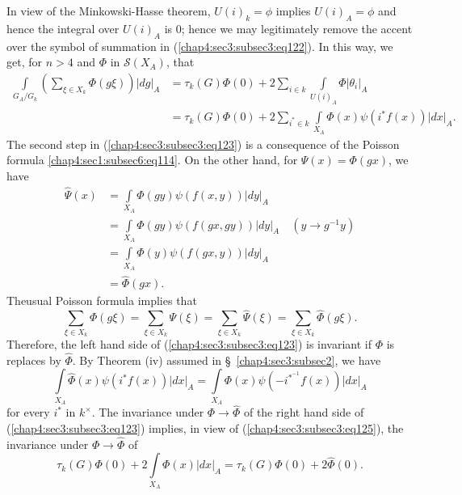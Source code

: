 In view of the Minkowski-Hasse theorem, $U(i)_{k}=\phi$ implies
$U(i)_{A}=\phi$ and hence the integral over $U(i)_{A}$ is $0$; hence
we may legitimately remove the accent over the symbol of summation in
(\ref{chap4:sec3:subsec3:eq122}). In this way, we get, for $n>4$ and $\Phi$ in
$\mathscr{S}(X_{A})$, that
\begin{equation*}
  \begin{split}
    \int\limits_{G_{A}/G_{k}}\left(\sum_{\xi\in
      X_{k}}\Phi(g\xi)\right)|dg|_{A} &= \tau_{k}(G)\Phi(0)+2\sum_{i\in
      k}\int\limits_{U(i)_{A}}\Phi|\theta_{i}|_{A}\\
    &= \tau_{k}(G)\Phi(0)+2\sum_{i^{\ast}\in
      k}\int\limits_{X_{A}}\Phi(x)\psi(i^{\ast}f(x))|dx|_{A}. 
  \end{split}\tag{123}\label{chap4:sec3:subsec3:eq123}
\end{equation*}
The second step in (\ref{chap4:sec3:subsec3:eq123}) is a consequence of the Poisson formula
\ref{chap4:sec1:subsec6:eq114}. On the other hand, for $\Psi(x)=\Phi(gx)$, we have
\begin{align*}
  \hat{\Psi}(x) &= \int\limits_{X_{A}}\Phi(gy)\psi(f(x,y))|dy|_{A}\\
  &= \int\limits_{X_{A}}\Phi(gy)\psi(f(gx,gy))|dy|_{A}\quad (y\to
  g^{-1}y)\\
  &= \int\limits_{X_{A}}\Phi(y)\psi(f(gx,y))|dy|_{A}\\
  &= \hat{\Phi}(gx).
\end{align*}
The\pageoriginale usual Poisson formula implies that
\begin{equation*}
  \sum_{\xi \in X_{k}}\Phi(g\xi)=\sum_{\xi\in
    X_{k}}\Psi(\xi)=\sum_{\xi\in X_{k}}\hat{\Psi}(\xi)
  =\sum_{\xi\in
    X_{k}}\hat{\Phi}(g\xi).\tag{124} \label{chap4:sec3:subsec3:eq124}
\end{equation*}
Therefore, the left hand side of (\ref{chap4:sec3:subsec3:eq123}) is invariant if $\Phi$ is
replaces by $\hat{\Phi}$. By Theorem (iv) assumed in
\S\ \ref{chap4:sec3:subsec2}, we have
\begin{equation*}
  \int\limits_{X_{A}}\hat{\Phi}(x)\psi(i^{\ast}f(x))|dx|_{A}
  =\int\limits_{X_{A}}\Phi(x)\psi(-i^{\ast^{-1}}f(x))|dx|_{A}
  \tag{125} \label{chap4:sec3:subsec3:eq125}  
\end{equation*}
for every $i^{\ast}$ in $k^{\times}$. The invariance under $\Phi\to
\hat{\Phi}$ of the right hand side of (\ref{chap4:sec3:subsec3:eq123})
implies, in view of (\ref{chap4:sec3:subsec3:eq125}), the invariance under $\Phi\to
\hat{\Phi}$ of
$$
\tau_{k}(G)\Phi(0)+2\int\limits_{X_{A}}\Phi(x)|dx|_{A}
=\tau_{k}(G)\Phi(0)+2\hat{\Phi}(0). 
$$

